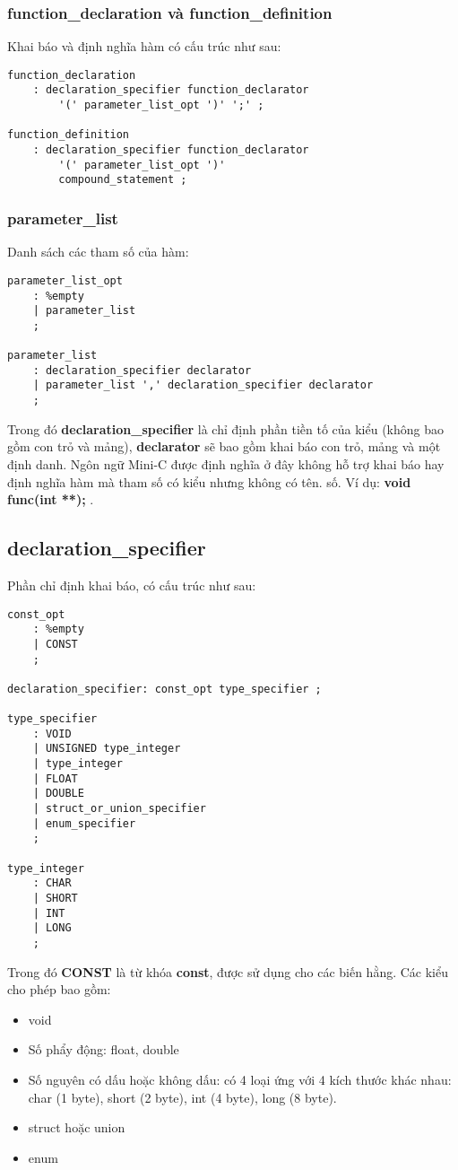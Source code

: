 \documentclass[../report.tex]{subfiles}
\begin{document}
\subsubsection{function\_declaration và function\_definition}
Khai báo và định nghĩa hàm có cấu trúc như sau: 
\begin{lstlisting}
function_declaration 
    : declaration_specifier function_declarator 
        '(' parameter_list_opt ')' ';' ;

function_definition
    : declaration_specifier function_declarator 
        '(' parameter_list_opt ')' 
        compound_statement ;
\end{lstlisting}

\subsubsection{parameter\_list}
Danh sách các tham số của hàm: 
\begin{lstlisting}
parameter_list_opt
    : %empty
    | parameter_list
    ;

parameter_list
    : declaration_specifier declarator 
    | parameter_list ',' declaration_specifier declarator
    ;
\end{lstlisting}
Trong đó \textbf{declaration\_specifier} là chỉ định 
phần tiền tố của kiểu (không bao gồm con trỏ và mảng), 
\textbf{declarator} sẽ bao gồm khai báo con trỏ, 
mảng và một định danh. Ngôn ngữ Mini-C được định nghĩa ở đây không 
hỗ trợ khai báo hay định nghĩa hàm mà 
tham số có kiểu nhưng không có tên.
số. Ví dụ: \textbf{void func(int **); }. \\

\subsection{declaration\_specifier}
Phần chỉ định khai báo, có cấu trúc như sau: 
\begin{lstlisting}
const_opt
    : %empty
    | CONST
    ;

declaration_specifier: const_opt type_specifier ;

type_specifier
    : VOID
    | UNSIGNED type_integer
    | type_integer
    | FLOAT 
    | DOUBLE
    | struct_or_union_specifier
    | enum_specifier
    ;

type_integer
    : CHAR
    | SHORT
    | INT
    | LONG
    ;
\end{lstlisting}
Trong đó \textbf{CONST} là từ khóa \textbf{const}, được sử dụng 
cho các biến hằng. Các kiểu cho phép bao gồm: 
\begin{itemize}
\item void
\item Số phẩy động: float, double
\item Số nguyên có dấu hoặc không dấu: 
    có 4 loại ứng với 4 kích thước
    khác nhau: char (1 byte), short (2 byte), 
    int (4 byte), long (8 byte). 
\item struct hoặc union
\item enum 
\end{itemize}
\end{document}
